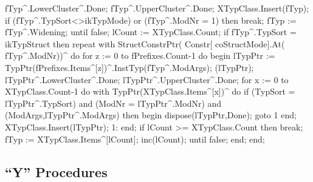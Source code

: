         fTyp^.LowerCluster^.Done;
         fTyp^.UpperCluster^.Done;
         XTypClass.Insert(fTyp);
         if (fTyp^.TypSort<>ikTypMode) or (fTyp^.ModNr = 1) then break;
         fTyp := fTyp^.Widening;
      until false;
      lCount := XTypClass.Count;
      if fTyp^.TypSort = ikTypStruct then
         repeat
            with StructConstrPtr( Constr[ coStructMode].At( fTyp^.ModNr))^ do
               for z := 0 to fPrefixes.Count-1 do
               begin
                  lTypPtr := TypPtr(fPrefixes.Items^[z])^.InstTyp(fTyp^.ModArgs);
                  (lTypPtr);
                  lTypPtr^.LowerCluster^.Done;
                  lTypPtr^.UpperCluster^.Done;
                  for x := 0 to XTypClass.Count-1 do
                     with TypPtr(XTypClass.Items^[x])^ do
                        if (TypSort = lTypPtr^.TypSort) and (ModNr = lTypPtr^.ModNr) and
                              (ModArgs,lTypPtr^.ModArgs) then
                        begin
                           dispose(lTypPtr,Done);
                           goto 1
                        end;
                  XTypClass.Insert(lTypPtr);
                  1:
               end;
            if lCount >= XTypClass.Count then break;
            fTyp := XTypClass.Items^[lCount];
            inc(lCount);
         until false;
   end;
end;
\eatline
{}\nwendcode{}\nwdocspar
\subsection{``Y'' Procedures}

